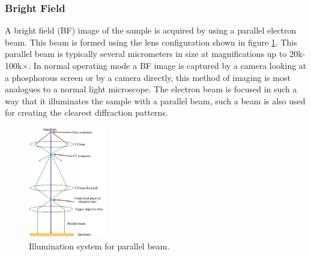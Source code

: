 \subsubsection{Bright Field}
A bright field (BF) image of the sample is acquired by using a parallel electron beam. This beam is formed using the lens configuration shown in figure \ref{fig:tem_operating}. This parallel beam is typically several micrometers in size at magnifications up to 20k-100k$\times$.
In normal operating mode a BF image is captured by a camera looking at a phosphorous screen or by a camera directly, this method of imaging is most analogues to a normal light microscope.
The electron beam is focused in such a way that it illuminates the sample with a parallel beam, such a beam is also used for creating the clearest diffraction patterns.
\begin{figure}[h]
    \centering
    \includegraphics[width=0.3\textwidth, keepaspectratio]{resources/Figures/tem_operating.png}
    \caption{Illumination system for parallel beam.}
    \label{fig:tem_operating}
\end{figure}

